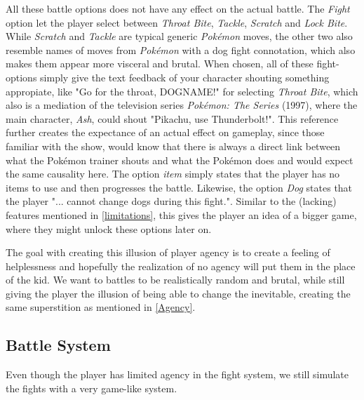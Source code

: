 All these battle options does not have any effect on the actual battle. The \textit{Fight} option let the player select between \textit{Throat Bite}, \textit{Tackle}, \textit{Scratch} and \textit{Lock Bite}. While \textit{Scratch} and \textit{Tackle} are typical generic \textit{Pokémon} moves, the other two also resemble names of moves from \textit{Pokémon} with a dog fight connotation, which also makes them appear more visceral and brutal. When chosen, all of these fight-options simply give the text feedback of your character shouting something appropiate, like "Go for the throat, DOGNAME!" for selecting \textit{Throat Bite}, which also is a mediation of the television series \textit{Pokémon: The Series} (1997), where the main character, \textit{Ash}, could shout "Pikachu, use Thunderbolt!". This reference further creates the expectance of an actual effect on gameplay, since those familiar with the show, would know that there is always a direct link between what the Pokémon trainer shouts and what the Pokémon does and would expect the same causality here.
The option \textit{item} simply states that the player has no items to use and then progresses the battle. Likewise, the option \textit{Dog} states that the player "... cannot change dogs during this fight.". Similar to the (lacking) features mentioned in \ref{limitations}, this gives the player an idea of a bigger game, where they might unlock these options later on.\

The goal with creating this illusion of player agency is to create a feeling of helplessness and hopefully the realization of no agency will put them in the place of the kid. 
We want to battles to be realistically random and brutal, while still giving the player the illusion of being able to change the inevitable, creating the same superstition as mentioned in \ref{Agency}.\

\subsection{Battle System}
\label{battleSystem}
Even though the player has limited agency in the fight system, we still simulate the fights with a very game-like system.\

